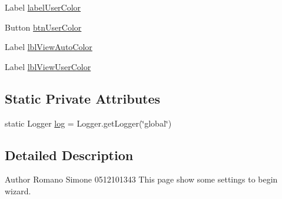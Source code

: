 \begin{DoxyCompactItemize}
\item 
Label \hyperlink{classit_1_1isislab_1_1masonassisteddocumentation_1_1mason_1_1wizards_1_1_b___project_information_page_a0cc1d0856402dfcda75702e789c68733}{label\-User\-Color}
\item 
Button \hyperlink{classit_1_1isislab_1_1masonassisteddocumentation_1_1mason_1_1wizards_1_1_b___project_information_page_a0c0c20817602a22ba74f88744083be6b}{btn\-User\-Color}
\item 
Label \hyperlink{classit_1_1isislab_1_1masonassisteddocumentation_1_1mason_1_1wizards_1_1_b___project_information_page_ae3ce9b9ca6502f09db614860f5a1a127}{lbl\-View\-Auto\-Color}
\item 
Label \hyperlink{classit_1_1isislab_1_1masonassisteddocumentation_1_1mason_1_1wizards_1_1_b___project_information_page_abf3d5350bf4a246805afb445ef49380a}{lbl\-View\-User\-Color}
\end{DoxyCompactItemize}
\subsection*{Static Private Attributes}
\begin{DoxyCompactItemize}
\item 
static Logger \hyperlink{classit_1_1isislab_1_1masonassisteddocumentation_1_1mason_1_1wizards_1_1_b___project_information_page_a0950f901b19ba8f8e20acdd4d69fd720}{log} = Logger.\-get\-Logger(\char`\"{}global\char`\"{})
\end{DoxyCompactItemize}


\subsection{Detailed Description}
\begin{DoxyAuthor}{Author}
Romano Simone 0512101343 This page show some settings to begin wizard. 
\end{DoxyAuthor}


